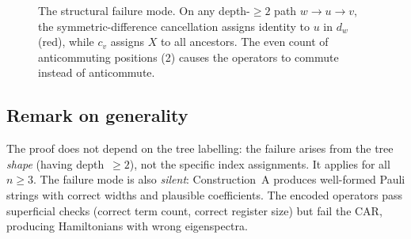 \begin{figure}[t]
\centering
{}
\caption{The structural failure mode.  On any depth-$\ge 2$ path
$w \to u \to v$, the symmetric-difference cancellation assigns
identity to $u$ in $d_w$ (red), while $c_v$ assigns $X$ to all
ancestors.  The even count of anticommuting positions (2) causes the
operators to commute instead of anticommute.}
\label{fig:structural-failure}
\end{figure}

\subsection{Remark on generality}

The proof does not depend on the tree labelling: the failure arises
from the tree \emph{shape} (having depth~$\ge 2$), not the specific
index assignments.  It applies for all~$n \ge 3$.  The failure mode
is also \emph{silent}: Construction~A produces well-formed Pauli
strings with correct widths and plausible coefficients.  The encoded
operators pass superficial checks (correct term count, correct
register size) but fail the CAR, producing Hamiltonians with wrong
eigenspectra.
